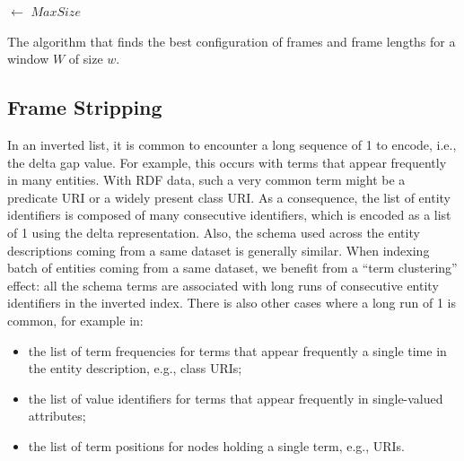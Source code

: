 \SetAlFnt{\sf}
\IncMargin{.5em}
\begin{algorithm}
\SetAlgoLined
\LinesNumbered
{}


\BlankLine
\BlankLine

\BestSize $\leftarrow$ $MaxSize$\;
\caption{The algorithm that finds the best configuration of frames and frame
lengths for a window $W$ of size $w$.}
\label{algo:afor2-opt}
\end{algorithm}
\DecMargin{.5em}

\subsection{Frame Stripping}
\label{sec:compression:stripping}

In an inverted list, it is common to encounter a long sequence of 1 to encode,
i.e., the delta gap value. For example, this occurs with terms that appear
frequently in many entities. With RDF data, such a very common term might be a
predicate URI or a widely present class URI. As a consequence, the list of
entity identifiers is composed of many consecutive identifiers, which is
encoded as a list of 1 using the delta representation. Also, the schema used
across the entity descriptions coming from a same dataset is generally
similar. When indexing batch of entities coming from a same dataset, we
benefit from a ``term clustering'' effect: all the schema terms are associated
with long runs of consecutive entity identifiers in the inverted index. There
is also other cases where a long run of 1 is common, for example in:
\begin{itemize}
\item the list of term frequencies for terms that appear frequently a single
time in the entity description, e.g., class URIs;
\item the list of value identifiers for terms that appear frequently in
single-valued attributes;
\item the list of term positions for nodes holding a single term, e.g., URIs. 
\end{itemize}


